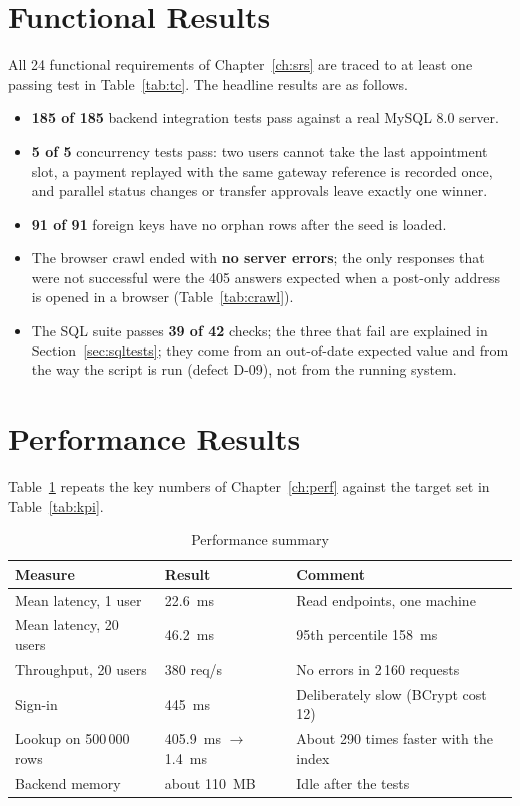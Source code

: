 \section{Functional Results}
All 24 functional requirements of Chapter~\ref{ch:srs} are traced to at least one
passing test in Table~\ref{tab:tc}. The headline results are as follows.
\begin{itemize}
\item \textbf{185 of 185} backend integration tests pass against a real MySQL 8.0 server.
\item \textbf{5 of 5} concurrency tests pass: two users cannot take the last appointment slot, a payment replayed with the same gateway reference is recorded once, and parallel status changes or transfer approvals leave exactly one winner.
\item \textbf{91 of 91} foreign keys have no orphan rows after the seed is loaded.
\item The browser crawl ended with \textbf{no server errors}; the only responses that were not successful were the 405 answers expected when a post-only address is opened in a browser (Table~\ref{tab:crawl}).
\item The SQL suite passes \textbf{39 of 42} checks; the three that fail are explained in Section~\ref{sec:sqltests}; they come from an out-of-date expected value and from the way the script is run (defect D-09), not from the running system.
\end{itemize}

\section{Performance Results}
Table~\ref{tab:perfsummary} repeats the key numbers of Chapter~\ref{ch:perf} against the
target set in Table~\ref{tab:kpi}.

\begin{table}[H]
\centering\small
\caption{Performance summary}\label{tab:perfsummary}
\begin{tabularx}{\linewidth}{@{}p{5.2cm}p{3.6cm}X@{}}
\toprule \textbf{Measure} & \textbf{Result} & \textbf{Comment}\\ \midrule
Mean latency, 1 user & 22.6~ms & Read endpoints, one machine\\
Mean latency, 20 users & 46.2~ms & 95th percentile 158~ms\\
Throughput, 20 users & 380 req/s & No errors in 2\,160 requests\\
Sign-in & 445~ms & Deliberately slow (BCrypt cost 12)\\
Lookup on 500\,000 rows & 405.9~ms $\rightarrow$ 1.4~ms & About 290 times faster with the index\\
Backend memory & about 110~MB & Idle after the tests\\
\bottomrule
\end{tabularx}
\end{table}

